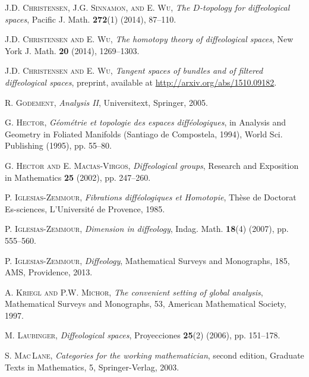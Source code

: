 \documentclass[12pt]{amsart}
\theoremstyle{remark}
\begin{document}
\begin{thebibliography}{CSW}

     {\scshape J.D. Christensen, J.G. Sinnamon, and E. Wu},
    \emph{The $D$-topology for diffeological spaces},
    Pacific J. Math. \textbf{272}(1) (2014), 87--110.

     {\scshape J.D. Christensen and E. Wu},
    \emph{The homotopy theory of diffeological spaces},
    New York J. Math. \textbf{20} (2014), 1269--1303.

     {\scshape J.D. Christensen and E. Wu},
    \emph{Tangent spaces of bundles and of filtered diffeological spaces},
    preprint, available at \url{http://arxiv.org/abs/1510.09182}.

     {\scshape R. Godement},
    \emph{Analysis II},
    Universitext, Springer, 2005.

     {\scshape G. Hector},
    \emph{G\'eom\'etrie et topologie des espaces diff\'eologiques},
    in Analysis and Geometry in Foliated Manifolds (Santiago de Compostela, 1994),
    World Sci. Publishing (1995), pp. 55--80.

     {\scshape G. Hector and E. Macias-Virgos},
    \emph{Diffeological groups},
    Research and Exposition in Mathematics \textbf{25} (2002), pp. 247--260.

     {\scshape P. Iglesias-Zemmour},
    \emph{Fibrations diff\'eologiques et Homotopie},
    Th\`ese de Doctorat Es-sciences, L'Universit\'e de Provence, 1985.

     {\scshape P. Iglesias-Zemmour},
    \emph{Dimension in diffeology},
    Indag. Math. \textbf{18}(4) (2007), pp. 555--560.

     {\scshape P. Iglesias-Zemmour},
    \emph{Diffeology},
    Mathematical Surveys and Monographs, 185, AMS, Providence, 2013.

     {\scshape A. Kriegl and P.W. Michor},
    \emph{The convenient setting of global analysis},
    Mathematical Surveys and Monographs, 53, American Mathematical Society, 1997.

     {\scshape M. Laubinger},
    \emph{Diffeological spaces},
    Proyecciones \textbf{25}(2) (2006), pp. 151--178.


     {\scshape S. Mac\,Lane},
    \emph{Categories for the working mathematician},
    second edition, Graduate Texts in Mathematics, 5, Springer-Verlag, 2003.


\end{thebibliography}
\end{document}
